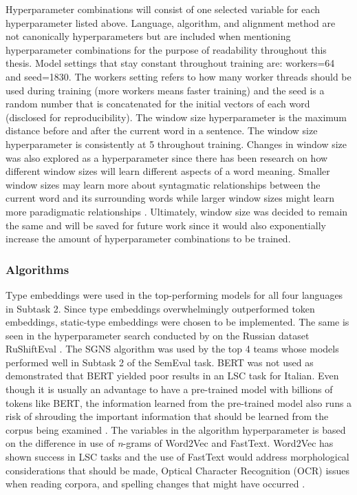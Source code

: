 Hyperparameter combinations will consist of one selected variable for each hyperparameter listed above. Language, algorithm, and alignment method are not canonically hyperparameters but are included when mentioning hyperparameter combinations for the purpose of readability throughout this thesis. 
Model settings that stay constant throughout training are: workers=64 and seed=1830. The workers setting refers to how many worker threads should be used during training (more workers means faster training) and the seed is a random number that is concatenated for the initial vectors of each word (disclosed for reproducibility). The window size hyperparameter is the maximum distance before and after the current word in a sentence. The window size hyperparameter is consistently at 5 throughout training. Changes in window size was also explored as a hyperparameter since there has been research on how different window sizes will learn different aspects of a word meaning. Smaller window sizes may learn more about syntagmatic relationships between the current word and its surrounding words while larger window sizes might learn more paradigmatic relationships \citep{dca2019-nulty}. Ultimately, window size was decided to remain the same and will be saved for future work since it would also exponentially increase the amount of hyperparameter combinations to be trained.


\subsubsection{Algorithms}

Type embeddings were used in the top-performing models for all four languages in Subtask 2.  Since type embeddings overwhelmingly outperformed token embeddings, static-type embeddings were chosen to be implemented. The same is seen in the hyperparameter search conducted by \citet{hengchen2021SBXrushifteval} on the Russian dataset RuShiftEval \citep{rushifteval2021}. The SGNS algorithm was used by the top 4 teams whose models performed well in Subtask 2 of the SemEval task. BERT was not used as \citet{laicher-2020} demonstrated that BERT yielded poor results in an LSC task for Italian. Even though it is usually an advantage to have a pre-trained model with billions of tokens like BERT, the information learned from the pre-trained model also runs a risk of shrouding the important information that should be learned from the corpus being examined \citep{hengchen2021challenges}. The variables in the algorithm hyperparameter is based on the difference in use of \emph{n}-grams of Word2Vec and FastText. Word2Vec has shown success in LSC tasks and the use of FastText would address morphological considerations that should be made, Optical Character Recognition (OCR) issues when reading corpora, and spelling changes that might have occurred \citep{bojanowski2017enriching}. 


